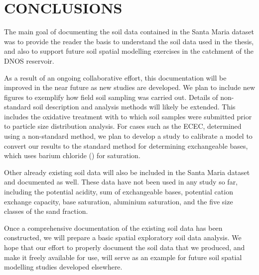 \section{CONCLUSIONS}

The main goal of documenting the soil data contained in the Santa Maria dataset was to provide the reader the 
basis to understand the soil data used in the thesis, and also to support future soil spatial modelling 
exercises in 
the catchment of the DNOS reservoir.

As a result of an ongoing collaborative effort, this documentation will be improved in the near future as new 
studies are developed. We plan to include new figures to exemplify how field soil sampling was carried out. 
Details of non-standard soil description and analysis methods will likely be extended. This includes the 
oxidative 
treatment with  to which soil samples were submitted prior to particle size distribution analysis. 
For 
cases such as the ECEC, determined using a non-standard method, we plan to develop a study to calibrate a 
model 
to convert our results to the standard method for determining exchangeable bases, which uses barium chloride 
() for saturation.

Other already existing soil data will also be included in the Santa Maria dataset and documented as well. 
These 
data have not been used in any study so far, including the potential acidity, sum of exchangeable bases, 
potential 
cation exchange capacity, base saturation, aluminium saturation, and the five size classes of the sand 
fraction.

Once a comprehensive documentation of the existing soil data has been constructed, we will prepare a basic 
spatial exploratory soil data analysis. We hope that our effort to properly document the soil data that we 
produced,
and make it freely available for use, will serve as an example for future soil spatial modelling studies 
developed 
elsewhere.

